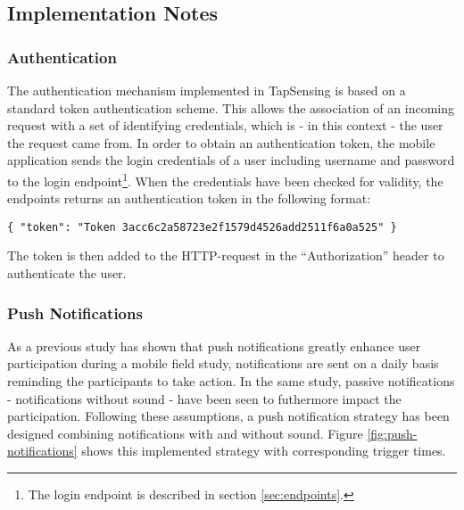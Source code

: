 \subsection{Implementation Notes}
\subsubsection{Authentication}
The authentication mechanism implemented in TapSensing is based on a standard token authentication scheme. This allows the association of an incoming request with a set of identifying credentials, which is - in this context - the user the request came from. In order to obtain an authentication token, the mobile application sends the login credentials of a user including username and password to the login endpoint\footnote{The login endpoint is described in section \ref{sec:endpoints}.}. When the credentials have been checked for validity, the endpoints returns an authentication token in the following format:
\begin{verbatim}
{ "token": "Token 3acc6c2a58723e2f1579d4526add2511f6a0a525" }
\end{verbatim}
The token is then added to the HTTP-request in the ``Authorization'' header to authenticate the user.

\subsubsection{Push Notifications}
As a previous study has shown that push notifications greatly enhance user participation \cite{pushNot} during a mobile field study, notifications are sent on a daily basis reminding the participants to take action. In the same study\cite{pushNot}, passive notifications - notifications without sound - have been seen to futhermore impact the participation. Following these assumptions, a push notification strategy has been designed combining notifications with and without sound. Figure \ref{fig:push-notifications} shows this implemented strategy with corresponding trigger times.

